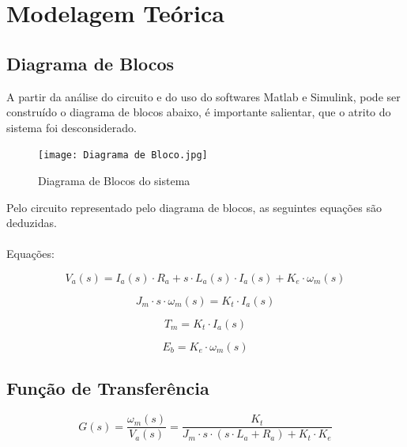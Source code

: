 \documentclass[12pt]{article}
\begin{document}
\section{Modelagem Teórica}
\subsection{Diagrama de Blocos}

\quad A partir da análise do circuito e do uso do softwares Matlab e Simulink, pode ser construído o diagrama de blocos abaixo, é importante salientar, que o atrito do sistema foi desconsiderado.

\begin{figure}[h] 
    \centering
    \texttt{[image: Diagrama de Bloco.jpg]}
    \caption{Diagrama de Blocos do sistema}
    \label{fig:mesh2}
\end{figure}

\quad Pelo circuito representado pelo diagrama de blocos, as seguintes equações são deduzidas.\\
\quad \\Equações:

\begin{equation}
    V_a (s) = I_a(s) \cdot R_a + s\cdot L_a(s)\cdot I_a (s) + K_e\cdot \omega_m (s)
\end{equation}

\begin{equation}
    J_m\cdot s \cdot \omega_m (s) = K_t \cdot I_a (s)
\end{equation}

\begin{equation}
    T_m = K_t \cdot I_a (s)
\end{equation}

\begin{equation}
    E_b = K_e \cdot \omega_m (s)
\end{equation}

\subsection{Função de Transferência}

\begin{equation}
    G(s) = \frac{\omega_m (s)}{V_a (s)} = \frac{K_t}{J_m \cdot s \cdot (s \cdot L_a + R_a) + K_t \cdot K_e}
\end{equation}
\end{document}
